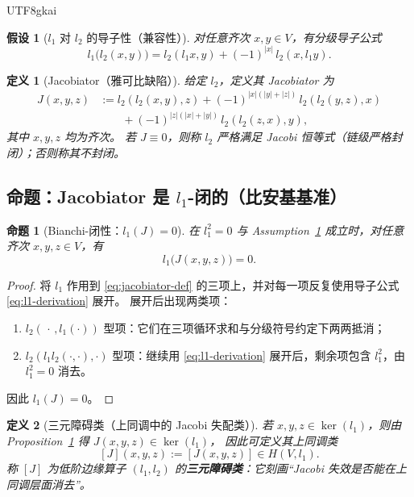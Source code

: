 \documentclass[12pt]{article}
\newtheorem{definition}{定义}[section]
\newtheorem{assumption}{假设}[section]
\newtheorem{proposition}{命题}[section]
\begin{document}
\begin{CJK*}{UTF8}{gkai}
\begin{assumption}[$l_1$ 对 $l_2$ 的导子性（兼容性）]
\label{ass:l1-derivation-l2}
对任意齐次 $x,y\in V$，有分级导子公式
\begin{equation}
\label{eq:l1-derivation}
  l_1\bigl(l_2(x,y)\bigr)
  =
  l_2(l_1x,y)+(-1)^{|x|}\,l_2(x,l_1y).
\end{equation}
\end{assumption}

\begin{definition}[Jacobiator（雅可比缺陷）]
给定 $l_2$，定义其 Jacobiator 为
\begin{equation}
\label{eq:jacobiator-def}
\begin{aligned}
  J(x,y,z)
  &:=
  l_2(l_2(x,y),z)
  +(-1)^{|x|(|y|+|z|)}\,l_2(l_2(y,z),x)
  \\
  &\qquad
  +(-1)^{|z|(|x|+|y|)}\,l_2(l_2(z,x),y),
\end{aligned}
\end{equation}
其中 $x,y,z$ 均为齐次。
若 $J\equiv 0$，则称 $l_2$ 严格满足 Jacobi 恒等式（链级严格封闭）；否则称其不封闭。
\end{definition}

\subsection{命题：Jacobiator 是 $l_1$-闭的（比安基基准）}

\begin{proposition}[Bianchi-闭性：$l_1(J)=0$]
\label{prop:bianchi-closed-jacobiator}
在 $l_1^2=0$ 与 Assumption~\ref{ass:l1-derivation-l2} 成立时，对任意齐次 $x,y,z\in V$，有
\[
  l_1\bigl(J(x,y,z)\bigr)=0.
\]
\end{proposition}

\begin{proof}
将 $l_1$ 作用到 \eqref{eq:jacobiator-def} 的三项上，并对每一项反复使用导子公式 \eqref{eq:l1-derivation} 展开。
展开后出现两类项：
\begin{enumerate}
  \item $l_2(\,\cdot\,,l_1(\cdot))$ 型项：它们在三项循环求和与分级符号约定下两两抵消；
  \item $l_2(l_1l_2(\cdot,\cdot),\cdot)$ 型项：继续用 \eqref{eq:l1-derivation} 展开后，剩余项包含 $l_1^2$，由 $l_1^2=0$ 消去。
\end{enumerate}
因此 $l_1(J)=0$。
\end{proof}

\begin{definition}[三元障碍类（上同调中的 Jacobi 失配类）]
\label{def:jacobiator-class}
若 $x,y,z\in\ker(l_1)$，则由 Proposition~\ref{prop:bianchi-closed-jacobiator} 得 $J(x,y,z)\in\ker(l_1)$，
因此可定义其上同调类
\[
  [J](x,y,z):=[J(x,y,z)]\in H(V,l_1).
\]
称 $[J]$ 为低阶边缘算子 $(l_1,l_2)$ 的\textbf{三元障碍类}：它刻画“Jacobi 失效是否能在上同调层面消去”。
\end{definition}


\end{CJK*}
\end{document}
